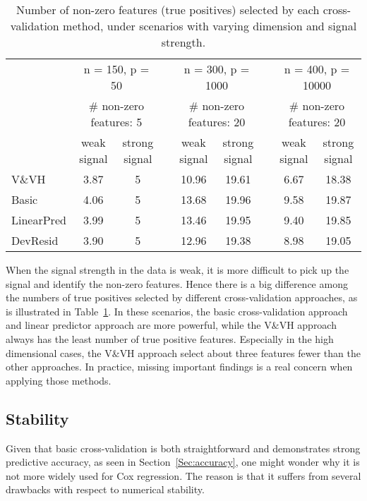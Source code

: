 \begin{table}[!htb]
\setlength{\tabcolsep}{3pt}
\caption{\label{Tab:power} Number of non-zero features (true positives) selected by each cross-validation method, under scenarios with varying dimension and signal strength.}
\centering
\begin{tabular}[t]{l cc c cc c cc}
\toprule
&\multicolumn{2}{c}{n = 150, p = 50} & & \multicolumn{2}{c}{n = 300, p = 1000} & & \multicolumn{2}{c}{n = 400, p = 10000} \\
&\multicolumn{2}{c}{$\#$ non-zero features: 5} & & \multicolumn{2}{c}{$\#$ non-zero features: 20} & & \multicolumn{2}{c}{$\#$ non-zero features: 20} \\
\cline{2-3} \cline{5-6} \cline{8-9}
& weak signal & strong signal & & weak signal & strong signal && weak signal & strong signal\\
V\&VH        & 3.87 & 5& & 10.96 & 19.61 & & 6.67 & 18.38\\
Basic          & 4.06 & 5& & 13.68 & 19.96 & & 9.58 & 19.87\\
LinearPred  & 3.99 & 5& & 13.46 & 19.95 & & 9.40 & 19.85\\
DevResid    & 3.90 & 5& & 12.96 & 19.38 & & 8.98 & 19.05\\
\bottomrule
\end{tabular}
\end{table}

When the signal strength in the data is weak, it is more difficult to pick up the signal and identify the non-zero features. Hence there is a big difference among the numbers of true positives selected by different cross-validation approaches, as is illustrated in Table~\ref{Tab:power}. In these scenarios, the basic cross-validation approach and linear predictor approach are more powerful, while the V$\&$VH approach always has the least number of true positive features. Especially in the high dimensional cases, the V$\&$VH approach select about three features fewer than the other approaches. In practice, missing important findings is a real concern when applying those methods.

\subsection {Stability}
\label{Sec:stability}

Given that basic cross-validation is both straightforward and demonstrates strong predictive accuracy, as seen in Section~\ref{Sec:accuracy}, one might wonder why it is not more widely used for Cox regression.  The reason is that it suffers from several drawbacks with respect to numerical stability.

